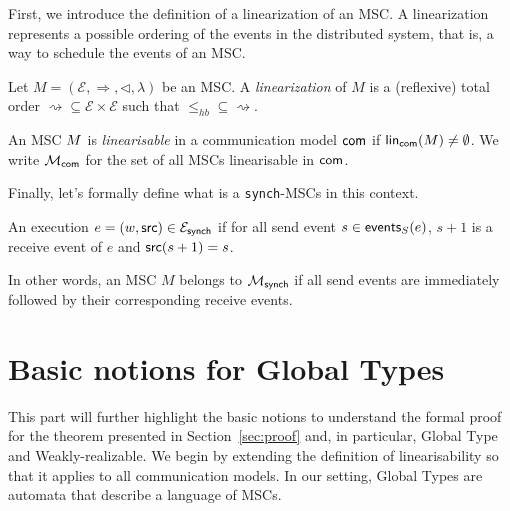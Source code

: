 
First, we introduce the definition of a linearization of an MSC. A
linearization represents a possible ordering of the events in the distributed
system, that is, a way to schedule the events of an MSC.

\begin{definition}
	Let $M = (\mathcal{E}, \Rightarrow, \triangleleft, \lambda)$ be an MSC.
	A \emph{linearization} of $M$ is a (reflexive) total order
	$\rightsquigarrow \subseteq \mathcal{E} \times \mathcal{E}$ such that
	$\leq_{hb} \subseteq \rightsquigarrow$. 
\end{definition}


	
\begin{definition}\label{def:linearisable-msc}
	An MSC $M$ is \textit{linearisable} in a communication model $\mathsf{com}$
	if $\mathsf{lin}_{\mathsf{com}}(M)\neq\emptyset$. %
	We write $\mathcal{M}_{\mathsf{com}}$ for the set of all MSCs 
	linearisable in $\mathsf{com}$.
\end{definition}

Finally, let's formally define what is a \verb|synch|-MSCs in this context.

\begin{definition}\label{def:synch}
	An execution $e=(w,\mathsf{src}) \in \mathcal{E}_{\mathsf{synch}}$
	if for all send event $s\in\mathsf{events}_S(e)$, $s+1$ is a receive event
	of $e$ and $\mathsf{src}(s+1)=s$.
\end{definition}


In other words, an MSC $M$ belongs to $\mathcal{M}_{\mathsf{synch}}$ if
all send events are immediately followed by their corresponding receive events.

\section{Basic notions for Global Types}
This part will further highlight the basic notions to understand the formal proof 
for the theorem presented in Section~\ref{sec:proof} and, in particular, Global Type
and Weakly-realizable. We begin by extending the definition of linearisability so 
that it applies to all communication models.
In our setting, Global Types are automata that describe a language of MSCs.

